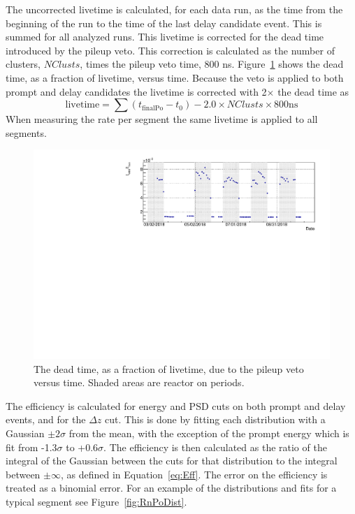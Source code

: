 The uncorrected livetime is calculated, for each data run, as the time from the beginning of the run to the time of the last delay candidate event. 
This is summed for all analyzed runs. 
This livetime is corrected for the dead time introduced by the pileup veto.
This correction is calculated as the number of clusters, $NClusts$, times the pileup veto time, 800 ns.
Figure~\ref{fig:vetotimevstime} shows the dead time, as a fraction of livetime, versus time.
Because the veto is applied to both prompt and delay candidates the livetime is corrected with 2$\times$ the dead time as
\begin{equation}
	\textrm{livetime} = \sum(t_{\textrm{finalPo}} - t_0) - 2.0 \times NClusts \times 800\textrm{ns}
\end{equation}
When measuring the rate per segment the same livetime is applied to all segments. 

\begin{figure}[!t]
	\centering
	\includegraphics[width=0.8\linewidth]{tex/6-ac227-images/AD_RateCalc/VetoTimeVsTime}
	\caption{The dead time, as a fraction of livetime, due to the pileup veto versus time. Shaded areas are reactor on periods.}
	\label{fig:vetotimevstime}
\end{figure}



The efficiency is calculated for energy and PSD cuts on both prompt and delay events, and for the $\Delta z$ cut.
This is done by fitting each distribution with a Gaussian $\pm 2\sigma$ from the mean, with the exception of the prompt energy which is fit from -1.3$\sigma$ to +0.6$\sigma$.
The efficiency is then calculated as the ratio of the integral of the Gaussian
between the cuts for that distribution to the integral between $\pm \infty$, as defined in Equation~\ref{eq:Eff}.
The error on the efficiency is treated as a binomial error.
For an example of the distributions and fits for a typical segment see Figure~\ref{fig:RnPoDist}.

